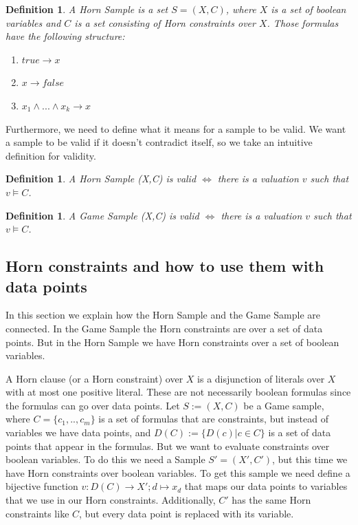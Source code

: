 \documentclass[10pt,a4paper]{article}
\theoremstyle{plain}
\newtheorem{mydef}[thm]{Definition}
\theoremstyle{definition}
\begin{document}
\begin{mydef}
A \emph{Horn Sample} is a set $S = (X,C)$, where $X$ is a set of boolean variables and $C$ is a set consisting of Horn constraints over $X$. Those formulas have the following structure:
\begin{enumerate}
\item $true \to x$
\item $x \to false$
\item $x_1 \wedge...\wedge x_k \to x $
\end{enumerate}
\end{mydef}

Furthermore, we need to define what it means for a sample to be valid. We want a sample to be valid if it doesn't contradict itself, so we take an intuitive definition for validity.  
\begin{mydef}
A Horn Sample (X,C) is \emph{valid} $\iff $ there is a valuation $v$ such that $v \vDash C$.
\end{mydef}
\begin{mydef}
A Game Sample (X,C) is \emph{valid} $\iff $ there is a valuation $v$ such that $v \vDash C$.
\end{mydef}

\subsection{Horn constraints and how to use them with data points}
In this section we explain how the Horn Sample and the Game Sample are connected. In the Game Sample the Horn constraints are over a set of data points. But in the Horn Sample we have Horn constraints over a set of boolean variables. 

A Horn clause (or a Horn constraint) over $X$ is a disjunction of literals over $X$ with at most one positive literal.
These are not necessarily boolean formulas since the formulas can go over data points. Let $S :=(X,C)$ be a Game sample, where $C = \{c_1,..,c_m\}$ is a set of formulas that are constraints, but instead of variables we have data points, and $D(C) := \{D(c)|c \in C\}$ is a set of data points that appear in the formulas. But we want to evaluate  constraints over boolean variables. To do this we need a Sample $S' = (X',C')$, but this time we have Horn constraints over boolean variables. To get this sample we need define a bijective function $v: D(C) \to X';d \mapsto x_d$ that maps our data points to variables that we use in our Horn constraints. Additionally, $C'$ has the same Horn constraints like $C$, but every data point is replaced with its variable. 
\end{document}
